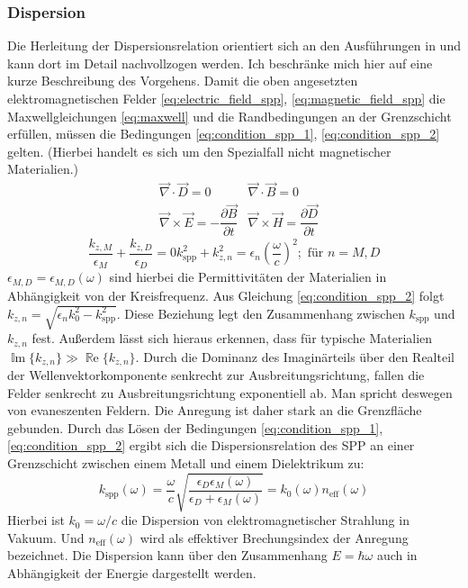 \documentclass{article}
\begin{document}
	\subsubsection{Dispersion}
	Die Herleitung der Dispersionsrelation orientiert sich an den Ausführungen in \cite[pp.~261--ff]{Fox.2020} und kann dort im Detail nachvollzogen werden. Ich beschränke mich hier auf eine kurze Beschreibung des Vorgehens.
	Damit die oben angesetzten elektromagnetischen Felder \eqref{eq:electric_field_spp}, \eqref{eq:magnetic_field_spp}  die Maxwellgleichungen \eqref{eq:maxwell} und die Randbedingungen an der Grenzschicht erfüllen, müssen die Bedingungen \eqref{eq:condition_spp_1},  \eqref{eq:condition_spp_2} gelten. (Hierbei handelt es sich um den Spezialfall nicht magnetischer Materialien.)
	\begin{align}
		\label{eq:maxwell}	
		&\vec{\nabla}\cdot\vec{D} = 0		&\vec{\nabla}\cdot\vec{B} = 0 \\
		&\vec{\nabla}\times\vec{E} = -\dfrac{\partial\vec{B}}{\partial t} 
		&\vec{\nabla}\times\vec{H} = 	\dfrac{\partial\vec{D}}{\partial t}\nonumber
	\end{align}
	\begin{subequations}
		\begin{equation}
			\label{eq:condition_spp_1}
			\dfrac{k_{z, M}}{\epsilon_M} + \dfrac{k_{z, D}}{\epsilon_D} = 0
		\end{equation}		
		\begin{equation}
			\label{eq:condition_spp_2}
			k_{\mathrm{spp}}^2 +k_{z, n}^2 = \epsilon_n\left(\dfrac{\omega}{c}\right)^2; \text{ für  } n=M,D
		\end{equation}
		\end{subequations}
		$\epsilon_{M, D} = \epsilon_{M, D}(\omega) $ sind hierbei die Permittivitäten der Materialien in Abhängigkeit von der Kreisfrequenz. Aus Gleichung \eqref{eq:condition_spp_2} folgt $k_{z, n} = \sqrt{\epsilon_n k_0^2 - k_{\mathrm{spp}}^2}$. Diese Beziehung legt den Zusammenhang zwischen $k_{\mathrm{spp}}$ und $k_{z, n}$ fest. Außerdem lässt sich hieraus erkennen, dass für typische Materialien $ \operatorname{\mathbb{I}m}\{k_{z, n}\} \gg \operatorname{\mathbb{R}e}\{k_{z, n}\}$. Durch die Dominanz des Imaginärteils über den Realteil der Wellenvektorkomponente senkrecht zur Ausbreitungsrichtung, fallen die Felder senkrecht zu Ausbreitungsrichtung exponentiell ab. Man spricht deswegen von evaneszenten Feldern. Die Anregung ist daher stark an die Grenzfläche gebunden. Durch das Lösen der Bedingungen \eqref{eq:condition_spp_1},  \eqref{eq:condition_spp_2} ergibt sich die Dispersionsrelation des SPP an einer Grenzschicht zwischen einem Metall und einem Dielektrikum zu: 
	\begin{equation}
		\label{eq:dispersion_spp}
		\boxed{
			k_{\mathrm{spp}}\left(\omega\right) = \dfrac{\omega}{c} \sqrt{\dfrac{\epsilon_D\epsilon_M(\omega)}{\epsilon_D + 	\epsilon_M(\omega)}}  = k_0(\omega) n_{\mathrm{eff}}(\omega)}
	\end{equation}
	Hierbei ist $k_0 = \omega / c$ die Dispersion von elektromagnetischer Strahlung in Vakuum. Und $n_{\mathrm{eff}}(\omega)$ wird als effektiver Brechungsindex der Anregung bezeichnet. Die Dispersion kann über den Zusammenhang $E = \hbar \omega$ auch in Abhängigkeit der Energie dargestellt werden.
	
\end{document}
